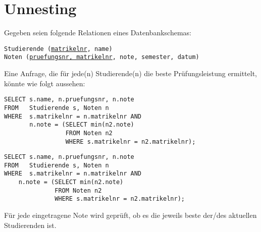 \section{Unnesting}
\label{unnesting}

Gegeben seien folgende Relationen eines Datenbankschemas:

\texttt{Studierende (\underline{matrikelnr}, name)} \\
\texttt{Noten (\underline{pruefungsnr, matrikelnr}, note, semester, datum)}

Eine Anfrage, die für jede(n) Studierende(n) die beste Prüfungsleistung ermittelt,
könnte wie folgt aussehen:

\cprotEnv
\begin{normalText}
\begin{lstlisting}
SELECT s.name, n.pruefungsnr, n.note
FROM   Studierende s, Noten n
WHERE  s.matrikelnr = n.matrikelnr AND
       n.note = (SELECT min(n2.note)
                 FROM Noten n2
                 WHERE s.matrikelnr = n2.matrikelnr);
\end{lstlisting}
\end{normalText}

\cprotEnv
\begin{beamerText}
\begin{lstlisting}
SELECT s.name, n.pruefungsnr, n.note
FROM   Studierende s, Noten n
WHERE  s.matrikelnr = n.matrikelnr AND
    n.note = (SELECT min(n2.note)
              FROM Noten n2
              WHERE s.matrikelnr = n2.matrikelnr);
\end{lstlisting}
\end{beamerText}


\begin{note}
Für jede eingetragene Note wird geprüft,
ob es die jeweils beste der/des aktuellen Studierenden ist.
\end{note}

